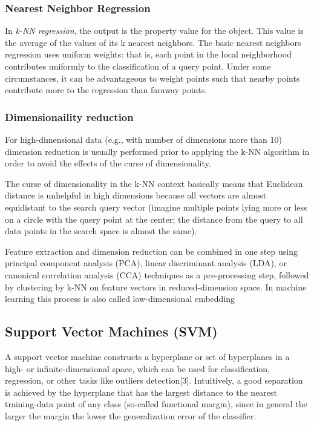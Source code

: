\documentclass[11pt]{article}
\theoremstyle{plain}
\theoremstyle{definition}
\begin{document}
\subsubsection{Nearest Neighbor Regression}
In \textit{k-NN regression}, the output is the property value for the object. This value is the average of the values of its k nearest neighbors. The basic nearest neighbors regression uses uniform weights: that is, each point in the local neighborhood contributes uniformly to the classification of a query point. Under some circumstances, it can be advantageous to weight points such that nearby points contribute more to the regression than faraway points. 



\subsubsection{Dimensionaility reduction}
For high-dimensional data (e.g., with number of dimensions more than 10) dimension reduction is usually performed prior to applying the k-NN algorithm in order to avoid the effects of the curse of dimensionality.

The curse of dimensionality in the k-NN context basically means that Euclidean distance is unhelpful in high dimensions because all vectors are almost equidistant to the search query vector (imagine multiple points lying more or less on a circle with the query point at the center; the distance from the query to all data points in the search space is almost the same).

Feature extraction and dimension reduction can be combined in one step using principal component analysis (PCA), linear discriminant analysis (LDA), or canonical correlation analysis (CCA) techniques as a pre-processing step, followed by clustering by k-NN on feature vectors in reduced-dimension space. In machine learning this process is also called low-dimensional embedding

\subsection{Support Vector Machines  (SVM)}
A support vector machine constructs a hyperplane or set of hyperplanes in a high- or infinite-dimensional space, which can be used for classification, regression, or other tasks like outliers detection[3]. Intuitively, a good separation is achieved by the hyperplane that has the largest distance to the nearest training-data point of any class (so-called functional margin), since in general the larger the margin the lower the generalization error of the classifier.
\end{document}
